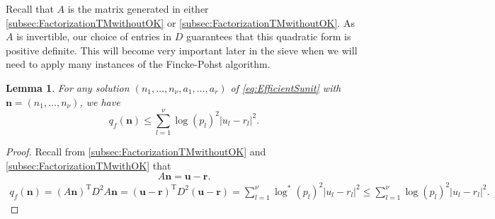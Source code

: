 \documentclass[11pt]{report}
\newtheorem{lemma}[theorem]{Lemma}
\theoremstyle{definition}
\begin{document}
Recall that $A$ is the matrix generated in either \autoref{subsec:FactorizationTMwithoutOK} or \autoref{subsec:FactorizationTMwithoutOK}. As $A$ is invertible, our choice of entries in $D$ guarantees that this quadratic form is positive definite. This will become very important later in the sieve when we will need to apply many instances of the Fincke-Pohst algorithm.

\begin{lemma} \label{lem:boundqf}
For any solution $( n_1, \dots, n_{\nu}, a_1, \dots, a_r)$ of \eqref{eq:EfficientSunit} with $\mathbf{n} = (n_1, \dots, n_{\nu})$, we have
\[q_f(\mathbf{n}) \leq \sum_{l = 1}^{\nu}\log(p_l)^2|u_l -r_l|^2.\]
\end{lemma}

\begin{proof}
Recall from \autoref{subsec:FactorizationTMwithoutOK} and \autoref{subsec:FactorizationTMwithOK} that
\[A\mathbf{n} = \mathbf{u} - \mathbf{r}.\]
\begin{align*}
  q_f(\mathbf{n})
  = (A\mathbf{n})^{\text{T}}D^2A\mathbf{n}
  = (\mathbf{u} - \mathbf{r})^{\text{T}}D^2(\mathbf{u} - \mathbf{r})
  = \sum_{l = 1}^{\nu}\log^*(p_l)^2|u_l-r_l|^2
  \leq \sum_{l = 1}^{\nu}\log(p_l)^2|u_l-r_l|^2.
\end{align*}

\end{proof}
\end{document}
